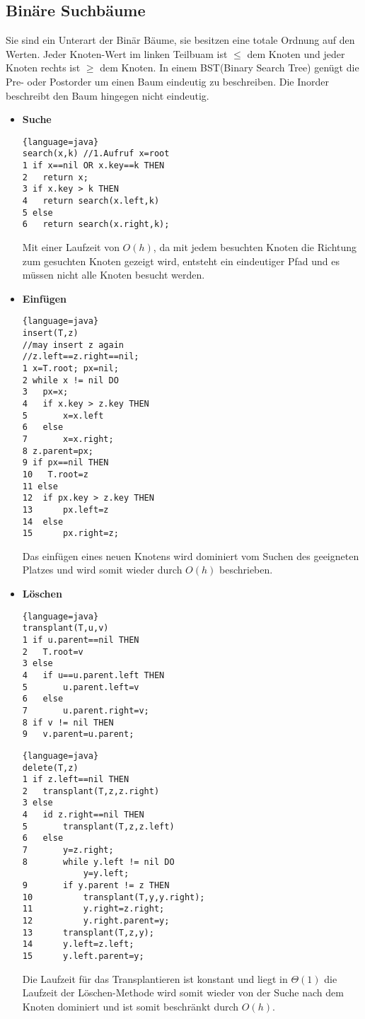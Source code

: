 \documentclass[jou,apacite]{apa6}
\begin{document}
    \subsection{Binäre Suchbäume}
    Sie sind ein Unterart der Binär Bäume, sie besitzen eine totale Ordnung auf den Werten. Jeder Knoten-Wert im linken Teilbuam ist $\leq$ dem Knoten und jeder Knoten rechts ist $\geq$ dem Knoten. In einem BST(Binary Search Tree) genügt die Pre- oder Postorder um einen Baum eindeutig zu beschreiben. Die Inorder beschreibt den Baum hingegen nicht eindeutig.
    \begin{itemize}
        \item {\bfseries Suche}
        \begin{lstlisting}{language=java}
search(x,k) //1.Aufruf x=root
1 if x==nil OR x.key==k THEN
2   return x;
3 if x.key > k THEN
4   return search(x.left,k)
5 else
6   return search(x.right,k);
        \end{lstlisting}
        Mit einer Laufzeit von $O(h)$, da mit jedem besuchten Knoten die Richtung zum gesuchten Knoten gezeigt wird, entsteht ein eindeutiger Pfad und es müssen nicht alle Knoten besucht werden.
        
        \item {\bfseries Einfügen}
        \begin{lstlisting}{language=java}
insert(T,z)
//may insert z again
//z.left==z.right==nil;
1 x=T.root; px=nil;
2 while x != nil DO
3   px=x;
4   if x.key > z.key THEN
5       x=x.left
6   else
7       x=x.right;
8 z.parent=px;
9 if px==nil THEN
10   T.root=z
11 else
12  if px.key > z.key THEN
13      px.left=z
14  else
15      px.right=z;
        \end{lstlisting}
        Das einfügen eines neuen Knotens wird dominiert vom Suchen des geeigneten Platzes und wird somit wieder durch $O(h)$ beschrieben.
        \item {\bfseries Löschen}
        \begin{lstlisting}{language=java}
transplant(T,u,v)
1 if u.parent==nil THEN
2   T.root=v
3 else
4   if u==u.parent.left THEN
5       u.parent.left=v
6   else
7       u.parent.right=v;
8 if v != nil THEN
9   v.parent=u.parent;
        \end{lstlisting}
        \begin{lstlisting}{language=java}
delete(T,z)
1 if z.left==nil THEN
2   transplant(T,z,z.right)
3 else
4   id z.right==nil THEN
5       transplant(T,z,z.left)
6   else
7       y=z.right;
8       while y.left != nil DO
            y=y.left;
9       if y.parent != z THEN
10          transplant(T,y,y.right);
11          y.right=z.right;
12          y.right.parent=y;
13      transplant(T,z,y);
14      y.left=z.left;
15      y.left.parent=y;
        \end{lstlisting}
        Die Laufzeit für das Transplantieren ist konstant und liegt in $\Theta(1)$ die Laufzeit der Löschen-Methode wird somit wieder von der Suche nach dem Knoten dominiert und ist somit beschränkt durch $O(h)$.
    \end{itemize}
    
\end{document}
